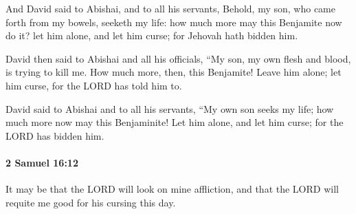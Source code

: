 			\begin{versebox}
					\item[BHS] 
					\item[ASV] And David said to Abishai, and to all his servants, Behold, my son, who came forth from my bowels, seeketh my life: how much more may this Benjamite now do it? let him alone, and let him curse; for Jehovah hath bidden him.
					\item[NIV] David then said to Abishai and all his officials, “My son, my own flesh and blood, is trying to kill me. How much more, then, this Benjamite! Leave him alone; let him curse, for the LORD has told him to.
					\item[NRSV] David said to Abishai and to all his servants, “My own son seeks my life; how much more now may this Benjaminite! Let him alone, and let him curse; for the LORD has bidden him.
			\end{versebox}

		\paragraph{2 Samuel 16:12} %
			\label{2SAMUEL-16-12}

			It may be that the LORD will look on mine affliction, and that the LORD will requite me good for his cursing this day.

